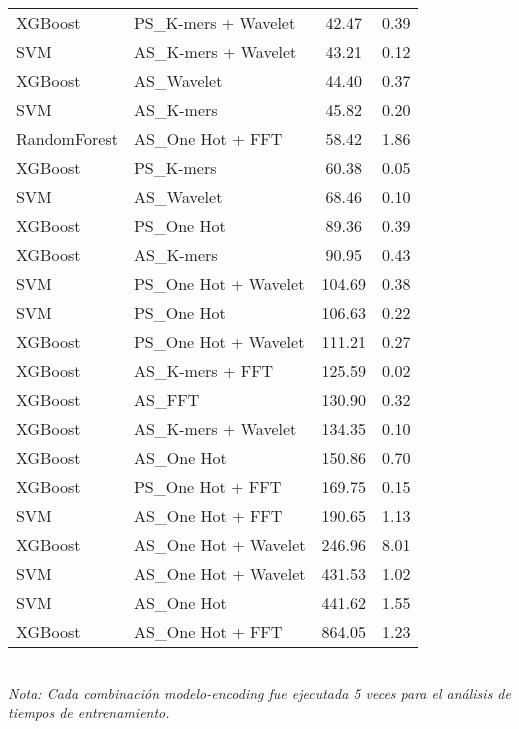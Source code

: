 \begin{table*}[htbp]
\begin{tabular}{llcc}
XGBoost & PS\_K-mers + Wavelet & 42.47 & 0.39 \\
SVM & AS\_K-mers + Wavelet & 43.21 & 0.12 \\
XGBoost & AS\_Wavelet & 44.40 & 0.37 \\
SVM & AS\_K-mers & 45.82 & 0.20 \\
RandomForest & AS\_One Hot + FFT & 58.42 & 1.86 \\
XGBoost & PS\_K-mers & 60.38 & 0.05 \\
SVM & AS\_Wavelet & 68.46 & 0.10 \\
XGBoost & PS\_One Hot & 89.36 & 0.39 \\
XGBoost & AS\_K-mers & 90.95 & 0.43 \\
SVM & PS\_One Hot + Wavelet & 104.69 & 0.38 \\
SVM & PS\_One Hot & 106.63 & 0.22 \\
XGBoost & PS\_One Hot + Wavelet & 111.21 & 0.27 \\
XGBoost & AS\_K-mers + FFT & 125.59 & 0.02 \\
XGBoost & AS\_FFT & 130.90 & 0.32 \\
XGBoost & AS\_K-mers + Wavelet & 134.35 & 0.10 \\
XGBoost & AS\_One Hot & 150.86 & 0.70 \\
XGBoost & PS\_One Hot + FFT & 169.75 & 0.15 \\
SVM & AS\_One Hot + FFT & 190.65 & 1.13 \\
XGBoost & AS\_One Hot + Wavelet & 246.96 & 8.01 \\
SVM & AS\_One Hot + Wavelet & 431.53 & 1.02 \\
SVM & AS\_One Hot & 441.62 & 1.55 \\
XGBoost & AS\_One Hot + FFT & 864.05 & 1.23 \\
\bottomrule
\end{tabular}
\\[0.5em]
\footnotesize
\textit{Nota: Cada combinación modelo-encoding fue ejecutada 5 veces para el análisis de tiempos de entrenamiento.}
\end{table*}